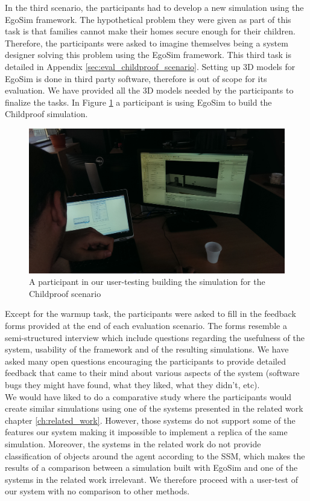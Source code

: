 In the third scenario, the participants had to develop a new simulation using the EgoSim framework. The hypothetical problem they were given as part of this task is that families cannot make their homes secure enough for their children. Therefore, the participants were asked to imagine themselves being a system designer solving this problem using the EgoSim framework. This third task is detailed in Appendix \ref{sec:eval_childproof_scenario}. Setting up 3D models for EgoSim is done in third party software, therefore is out of scope for its evaluation. We have provided all the 3D models needed by the participants to finalize the tasks. In Figure \ref{fig:eval_childproof_tryout} a participant is using EgoSim to build the Childproof simulation.\\
\begin{figure}[H]
	\centering
	\includegraphics[width=\linewidth]{gfx/Chapter5/childproof}
	\caption{A participant in our user-testing building the simulation for the Childproof scenario}
	\label{fig:eval_childproof_tryout}
\end{figure}

Except for the warmup task, the participants were asked to fill in the feedback forms provided at the end of each evaluation scenario. The forms resemble a semi-structured interview which include questions regarding the usefulness of the system, usability of the framework and of the resulting simulations. We have asked many open questions encouraging the participants to provide detailed feedback that came to their mind about various aspects of the system (software bugs they might have found, what they liked, what they didn't, etc).\\

We would have liked to do a comparative study where the participants would create similar simulations using one of the systems presented in the related work chapter \ref{ch:related_work}. However, those systems do not support some of the features our system making it impossible to implement a replica of the same simulation. Moreover, the systems in the related work do not provide classification of objects around the agent according to the SSM, which makes the results of a comparison between a simulation built with EgoSim and one of the systems in the related work irrelevant. We therefore proceed with a user-test of our system with no comparison to other methods.\\

